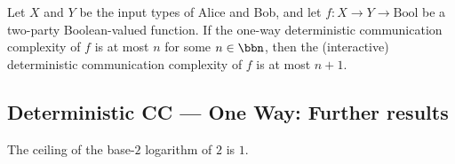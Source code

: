 \begin{theorem}
\label{CommunicationComplexity.Deterministic.OneWay.deterministic_communicationComplexity_le_of_oneWay_le_bool}
\leanok
{}
Let $X$ and $Y$ be the input types of Alice and Bob, and let $f : X \to Y \to
\mathrm{Bool}$ be a two-party Boolean-valued function. If the one-way deterministic
communication complexity of $f$ is at most $n$ for some $n \in \bbn$, then the
(interactive) deterministic communication complexity of $f$ is at most $n + 1$.
\end{theorem}

\subsection*{Deterministic CC --- One Way: Further results}

\begin{theorem}
\label{CommunicationComplexity.Deterministic.OneWay.clog_two_two}
\leanok
{}
The ceiling of the base-$2$ logarithm of $2$ is $1$.
\end{theorem}
